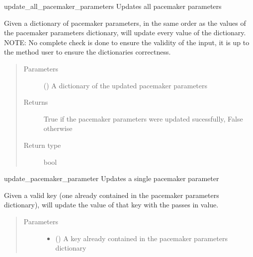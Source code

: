 \documentclass[letterpaper,10pt,english]{sphinxmanual}
\begin{document}
\begin{fulllineitems}

\begin{fulllineitems}
\label{\detokenize{flaskapp.data:flaskapp.data.user.User.update_all_pacemaker_parameters}}
update\_all\_pacemaker\_parameters Updates all pacemaker parameters

Given a dictionary of pacemaker parameters, in the same order as the values of
the pacemaker parameters dictionary, will update every value of the dictionary.
NOTE: No complete check is done to ensure the validity of the input, it is up
to the method user to ensure the dictionaries correctness.
\begin{quote}\begin{description}
\item[{Parameters}] \leavevmode
{} () \textendash{} A dictionary of the updated pacemaker parameters

\item[{Returns}] \leavevmode
True if the pacemaker parameters were updated sucessfully, False otherwise

\item[{Return type}] \leavevmode
bool

\end{description}\end{quote}

\end{fulllineitems}


\begin{fulllineitems}
\label{\detokenize{flaskapp.data:flaskapp.data.user.User.update_pacemaker_parameter}}
update\_pacemaker\_parameter Updates a single pacemaker parameter

Given a valid key (one already contained in the pacemaker parameters
dictionary), will update the value of that key with the passes in
value.
\begin{quote}\begin{description}
\item[{Parameters}] \leavevmode\begin{itemize}
\item {} 
 () \textendash{} A key already contained in the pacemaker parameters dictionary


\end{itemize}
\end{description}
\end{quote}
\end{fulllineitems}
\end{fulllineitems}
\end{document}
